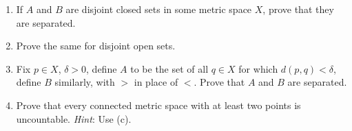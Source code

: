 \documentclass[12pt]{article}
\newenvironment{problem}[2][Exercise]{\begin{trivlist}
\item[\hskip \labelsep {\bfseries #1}\hskip \labelsep {\bfseries #2.}]}{\end{trivlist}}
\begin{document}
\begin{problem}{2.19}
\begin{enumerate}[label=(\alph*)]
	\item If $A$ and $B$ are disjoint closed sets in some metric space $X$, prove that they are separated.
	\item Prove the same for disjoint open sets.
	\item Fix $p\in X$, $\delta > 0$, define $A$ to be the set of all $q\in X$ for which $d\left(p,q\right)<\delta$, define $B$ similarly, with $>$ in place of $<$. Prove that $A$ and $B$ are separated.
	\item Prove that every connected metric space with at least two points is uncountable. \textit{Hint}: Use (c).
\end{enumerate}
\end{problem}
\end{document}
